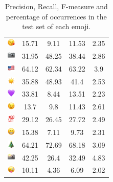 \documentclass{article}
\begin{document}
\begin{table}
\begin{tabular}{|c|ccc|c|}
\includegraphics[height=0.37cm,width=0.37cm]{img/face_blowing_a_kiss.png} & 15.71 & 9.11 & 11.53 & 2.35\\ 
\includegraphics[height=0.37cm,width=0.37cm]{img/camera.png} & 31.95 & 48.25 & 38.44 & 2.86\\ 
\includegraphics[height=0.37cm,width=0.37cm]{img/United_States.png} & 64.12 & 62.34 & 63.22 & 3.9\\ 
\includegraphics[height=0.37cm,width=0.37cm]{img/sun.png} & 35.88 & 48.93 & 41.4 & 2.53\\ 
\includegraphics[height=0.37cm,width=0.37cm]{img/purple_heart.png} & 33.81 & 8.44 & 13.51 & 2.23\\ 
\includegraphics[height=0.37cm,width=0.37cm]{img/winking_face.png} & 13.7 & 9.8 & 11.43 & 2.61\\ 
\includegraphics[height=0.37cm,width=0.37cm]{img/hundred_points.png} & 29.12 & 26.45 & 27.72 & 2.49\\ 
\includegraphics[height=0.37cm,width=0.37cm]{img/beaming_face_with_smiling_eyes.png} & 15.38 & 7.11 & 9.73 & 2.31\\ 
\includegraphics[height=0.37cm,width=0.37cm]{img/Christmas_tree.png} & 64.21 & 72.69 & 68.18 & 3.09\\ 
\includegraphics[height=0.37cm,width=0.37cm]{img/camera_with_flash.png} & 42.25 & 26.4 & 32.49 & 4.83\\ 
\includegraphics[height=0.37cm,width=0.37cm]{img/winking_face_with_tongue.png} & 10.11 & 4.36 & 6.09 & 2.02\\ 

\hline
\end{tabular}
\caption{\label{table:emoji_detailed} Precision, Recall, F-measure and percentage of occurrences in the test set of each emoji.}
\end{table}
\end{document}
